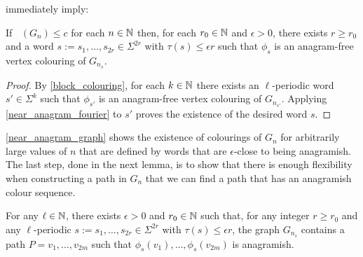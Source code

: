 \documentclass{patmorin}
\DeclareMathOperator{\afcn}{\dot{\chi}_\pi}
\begin{document}
 immediately imply:

\begin{lem}\label{near_anagram_graph}
    If $\afcn(G_n)\le c$ for each $n\in\mathbb{N}$ then, for each $r_0\in\mathbb{N}$ and $\epsilon>0$, there exists $r\ge r_0$ and a word $s:=s_1,\ldots,s_{2r}\in\Sigma^{2r}$ with $\tau(s)\le\epsilon r$ such that $\phi_s$ is an anagram-free vertex colouring of $G_{n_s}$.
\end{lem}

\begin{proof}
    By \cref{block_colouring}, for each $k\in\mathbb{N}$ there exists an $\ell$-periodic word $s'\in\Sigma^k$ such that $\phi_{s'}$ is an anagram-free vertex colouring of $G_{n_{s'}}$. Applying \cref{near_anagram_fourier} to $s'$ proves the existence of the desired word $s$.
\end{proof}

\cref{near_anagram_graph} shows the existence of colourings of $G_n$ for arbitrarily large values of $n$ that are defined by words that are $\epsilon$-close to being anagramish.  The last step, done in the next lemma, is to show that there is enough flexibility when constructing a path in $G_n$ that we can find a path that has an anagramish colour sequence.

\begin{lem}\label{anagramish_path}
    For any $\ell\in\mathbb{N}$, there exists $\epsilon>0$ and $r_0\in\mathbb{N}$ such that, for any integer $r\ge r_0$ and any $\ell$-periodic $s:=s_1,\ldots,s_{2r}\in\Sigma^{2r}$ with $\tau(s)\le\epsilon r$, the graph $G_{n_s}$ contains a path $P=v_1,\ldots,v_{2m}$ such that $\phi_s(v_1),\ldots,\phi_s(v_{2m})$ is anagramish.
\end{lem}
\end{document}
